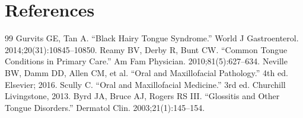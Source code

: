 \section*{References}
\begin{thebibliography}{99}
 Gurvits GE, Tan A. ``Black Hairy Tongue Syndrome.'' World J Gastroenterol. 2014;20(31):10845--10850.
 Reamy BV, Derby R, Bunt CW. ``Common Tongue Conditions in Primary Care.'' Am Fam Physician. 2010;81(5):627--634.
 Neville BW, Damm DD, Allen CM, et al. ``Oral and Maxillofacial Pathology.'' 4th ed. Elsevier; 2016.
 Scully C. ``Oral and Maxillofacial Medicine.'' 3rd ed. Churchill Livingstone, 2013.
 Byrd JA, Bruce AJ, Rogers RS III. ``Glossitis and Other Tongue Disorders.'' Dermatol Clin. 2003;21(1):145--154.
\end{thebibliography}

